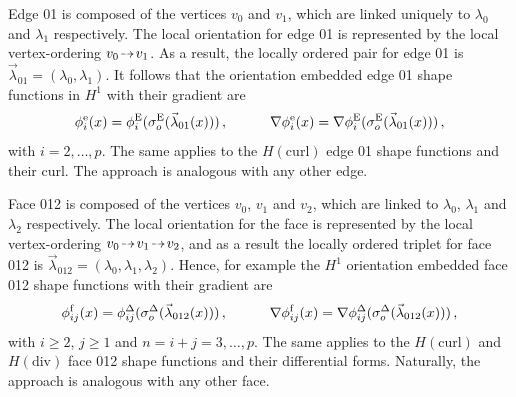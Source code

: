 Edge 01 is composed of the vertices $v_0$ and $v_1$, which are linked uniquely to $\lambda_0$ and $\lambda_1$ respectively.
The local orientation for edge 01 is represented by the local vertex-ordering $v_0\tdashto v_1$.
As a result, the locally ordered pair for edge 01 is $\vec{\lambda}_{01}=(\lambda_0,\lambda_1)$.
It follows that the orientation embedded edge 01 shape functions in $H^1$ with their gradient are
\begin{equation*}
	\phi_i^\mathrm{e}(x)=\phi_i^{\mathrm{E}}(\sigma_o^{\mathrm{E}}(\vec{\lambda}_{01}(x)))\,,\qquad\quad
		\nabla\phi_i^\mathrm{e}(x)=\nabla\phi_i^{\mathrm{E}}(\sigma_o^{\mathrm{E}}(\vec{\lambda}_{01}(x)))\,,
\end{equation*}
with $i=2,\ldots,p$.
The same applies to the $H(\mathrm{curl})$ edge 01 shape functions and their curl.
The approach is analogous with any other edge.

Face 012 is composed of the vertices $v_0$, $v_1$ and $v_2$, which are linked to $\lambda_0$, $\lambda_1$ and $\lambda_2$ respectively.
The local orientation for the face is represented by the local vertex-ordering $v_0\tdashto v_1\tdashto v_2$, and as a result the locally ordered triplet for face 012 is $\vec{\lambda}_{012}=(\lambda_0,\lambda_1,\lambda_2)$.
Hence, for example the $H^1$ orientation embedded face 012 shape functions with their gradient are
\begin{equation*}
	\phi_{ij}^\mathrm{f}(x)=\phi_{ij}^\Delta(\sigma_o^\Delta(\vec{\lambda}_{012}(x)))\,,\qquad\quad
		\nabla\phi_{ij}^\mathrm{f}(x)=\nabla\phi_{ij}^\Delta(\sigma_o^\Delta(\vec{\lambda}_{012}(x)))\,,
\end{equation*}
with $i\geq2$, $j\geq1$ and $n=i+j=3,\ldots,p$.
The same applies to the $H(\mathrm{curl})$ and $H(\mathrm{div})$ face 012 shape functions and their differential forms.
Naturally, the approach is analogous with any other face.

